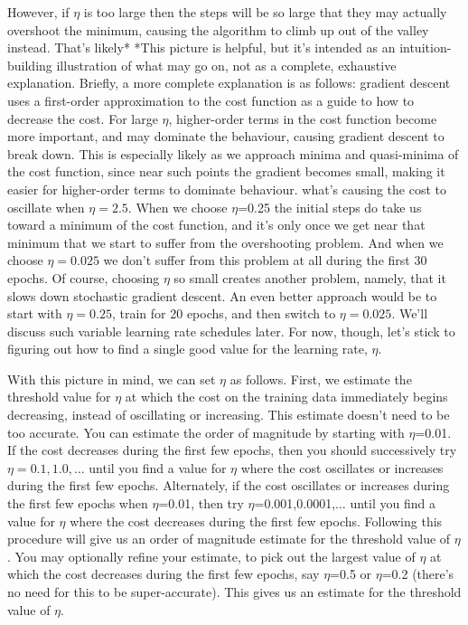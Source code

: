 \documentclass[a4paper,twoside,10pt]{book}
\begin{document}
However, if $\eta$ is too large then the steps will be so large that they may actually overshoot the minimum, causing the algorithm to climb up out of the valley instead. That's likely* *This picture is helpful, but it's intended as an intuition-building illustration of what may go on, not as a complete, exhaustive explanation. Briefly, a more complete explanation is as follows: gradient descent uses a first-order approximation to the cost function as a guide to how to decrease the cost. For large $\eta$, higher-order terms in the cost function become more important, and may dominate the behaviour, causing gradient descent to break down. This is especially likely as we approach minima and quasi-minima of the cost function, since near such points the gradient becomes small, making it easier for higher-order terms to dominate behaviour. what's causing the cost to oscillate when $\eta=2.5$. When we choose $\eta$=0.25 the initial steps do take us toward a minimum of the cost function, and it's only once we get near that minimum that we start to suffer from the overshooting problem. And when we choose $\eta=0.025$ we don't suffer from this problem at all during the first 30 epochs. Of course, choosing $\eta$ so small creates another problem, namely, that it slows down stochastic gradient descent. An even better approach would be to start with $\eta=0.25$, train for 20 epochs, and then switch to $\eta=0.025$. We'll discuss such variable learning rate schedules later. For now, though, let's stick to figuring out how to find a single good value for the learning rate, $\eta$.

With this picture in mind, we can set $\eta$ as follows. First, we estimate the threshold value for $\eta$ at which the cost on the training data immediately begins decreasing, instead of oscillating or increasing. This estimate doesn't need to be too accurate. You can estimate the order of magnitude by starting with $\eta$=0.01. If the cost decreases during the first few epochs, then you should successively try $\eta=0.1,1.0,\ldots$ until you find a value for $\eta$ where the cost oscillates or increases during the first few epochs. Alternately, if the cost oscillates or increases during the first few epochs when $\eta$=0.01, then try $\eta$=0.001,0.0001,$\ldots$ until you find a value for $\eta$ where the cost decreases during the first few epochs. Following this procedure will give us an order of magnitude estimate for the threshold value of $\eta$. You may optionally refine your estimate, to pick out the largest value of $\eta$ at which the cost decreases during the first few epochs, say $\eta$=0.5 or $\eta$=0.2 (there's no need for this to be super-accurate). This gives us an estimate for the threshold value of $\eta$.
\end{document}
